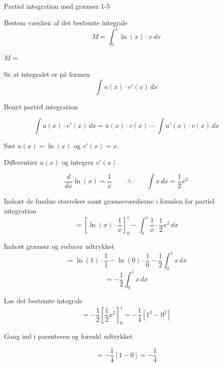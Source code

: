 \documentclass{article}
\begin{document}
\begin{exercise}{Partiel integration med grænser 1-5}
	
	
	Bestem værdien af det bestemte integrale
	\[
	M = \int_0^1 \ln(x) \cdot x \, dx
	\]
	
	$M$ =  
	
	
	\hint
	
	Se at integralet er på formen
	\[
	\int u(x) \cdot v'(x) \, dx
	\]
	
	\hint
	
	Benyt partiel integration
	
	\hint
	\[
	\int u(x) \cdot v'(x)\, dx = u(x) \cdot v(x) - \int u'(x) \cdot v(x) \, dx
	\]
	\hint
	
	Sæt $u(x) = \ln(x)$ og $v'(x) = x$.
	
	
	\hint
	
	Differentier $u(x)$ og integrer $v'(x)$.
	
	\hint
	\[
	\frac{d}{dx} \ln(x) = \frac{1}{x}  \qquad \wedge \qquad \int x \, dx = \frac{1}{2} x^2
	\]
	
	\hint
	
	Indsæt de fundne størrelser samt grænseværdierne i formlen for partiel integration 
	\[
	= \left[\ln(x) \cdot \frac{1}{x}\right]_{0}^{1} - \int_{0}^{1} \frac{1}{x} \cdot \frac{1}{2}x^2 \, dx
	\]
	
	\hint
	
	Indsæt grænser og reducer udtrykket
	\[
	= \ln(1) \cdot \frac{1}{1}  - \ln(0) \cdot \frac{1}{0}  -  \frac{1}{2} \int_{0}^{1} x  \, dx
	\]
	\[
	= -  \frac{1}{2} \int_{0}^{1} x  \, dx 
	\]
	
	\hint
	Løs det bestemte integrale
	\[
	=  - \frac{1}{2} \left[ \frac{1}{2}x^2  \right]_{0}^{1} = - \frac{1}{4} \left[ 1^2 - 0^2 \right]
	\]
	
	\hint
	Gang ind i parentesen og forenkl udtrykket
	
	\hint
	\[
	= - \frac{1}{4} \left[ 1 - 0\right] = -\frac{1}{4}
	\]
	
	
	
\end{exercise}

\newpage
\end{document}
